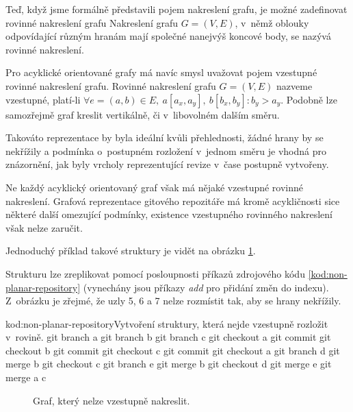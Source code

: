 \documentclass[
  biblatex,
  glossaries,
  index
]{kidiplom}
\begin{document}
Teď, když jsme formálně představili pojem nakreslení grafu, je možné zadefinovat rovinné nakreslení grafu
Nakreslení grafu $G = (V,E)$, v~němž oblouky odpovídající různým hranám mají
společné nanejvýš koncové body, se nazývá rovinné nakreslení.

Pro acyklické orientované grafy má navíc smysl uvažovat pojem vzestupné rovinné nakreslení grafu. Rovinné nakreslení grafu $G=(V,E)$ nazveme vzestupné, platí-li $\forall e=(a, b)\in E,\ a[a_x,a_y],\ b[b_x,b_y]\colon b_y > a_y$. Podobně lze samozřejmě graf kreslit vertikálně, či v~libovolném dalším směru.

Takováto reprezentace by byla ideální kvůli přehlednosti, žádné hrany by se nekřížily a podmínka o~postupném rozložení v~jednom směru je vhodná pro znázornění, jak byly vrcholy reprezentující revize v~čase postupně vytvořeny.

Ne každý acyklický orientovaný graf však má nějaké vzestupné rovinné nakreslení. Grafová reprezentace gitového repozitáře má kromě acykličnosti sice některé další omezující podmínky, existence vzestupného rovinného nakreslení však nelze zaručit.

Jednoduchý příklad takové struktury je vidět na obrázku \ref{fig:non-upward-planar}.

Strukturu lze zreplikovat pomocí posloupnosti příkazů zdrojového kódu \ref{kod:non-planar-repository} (vynechány jsou příkazy {\it add} pro přidání změn do indexu).
Z~obrázku je zřejmé, že uzly 5, 6 a 7 nelze rozmístit tak, aby se hrany nekřížily.

\begin{kicode}{}{kod:non-planar-repository}{Vytvoření struktury, která nejde vzestupně rozložit v~rovině.}
git branch a
git branch b
git branch c
git checkout a
git commit
git checkout b
git commit
git checkout c
git commit
git checkout a
git branch d
git merge b
git checkout c
git branch e
git merge b
git checkout d
git merge e
git merge a c
\end{kicode}

\begin{figure}[h]
\centering
{}
\caption{Graf, který nelze vzestupně nakreslit.}
\label{fig:non-upward-planar}
\end{figure}
\end{document}
